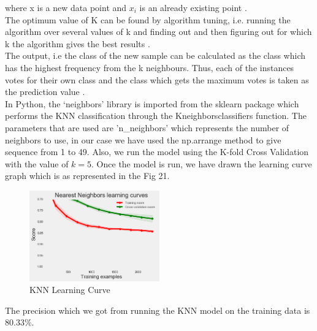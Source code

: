 where x is a new data point and $x_i$ is an already existing point \cite{link11}.\\
The optimum value of K can be found by algorithm tuning, i.e. running the algorithm over several values of k and finding out and then figuring out for which k the algorithm gives the best results \cite{link12}.\\
The output, i.e the class of the new sample can be calculated as the class which has the highest frequency from the k neighbours. Thus, each of the instances votes for their own class and the class which gets the maximum votes is taken as the prediction value \cite{link12}. \\
In Python, the `neighbors' library is imported from the sklearn package which performs the KNN classification through the Kneighborsclassifiers function. The parameters that are used are 'n\_neighbors' which represents the number of neighbors to use, in our case we have used the np.arrange method to give  sequence from 1 to 49. Also, we run the model using the K-fold Cross Validation with the value of $k=5$. Once the model is run, we have drawn the learning curve graph which is as represented in the Fig 21. 

\begin{figure}[H]
\caption{KNN Learning Curve}
\label{5.2}
\centering
\includegraphics[width=0.5\textwidth]{images/5_2.png}
\end{figure}

The precision which we got from running the KNN model on the training data is 80.33\%.

